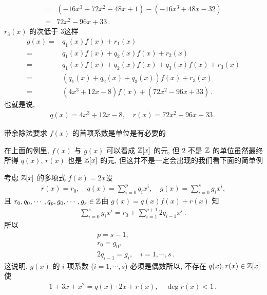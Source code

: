 \begin{example}
\begin{align*}
        = {} & (-16x^3 + 72x^2 - 48x + 1) - (-16x^3 + 48x - 32)  \\
        = {} & 72x^2 - 96x + 33 \period
    \end{align*}
    $r_3 (x)$ 的次低于 $3$\period 这样
    \begin{align*}
        g(x)
        = {} & q_1 (x) f(x) + r_1 (x)                               \\
        = {} & q_1 (x) f(x) + q_2 (x) f(x) + r_2 (x)                \\
        = {} & q_1 (x) f(x) + q_2 (x) f(x) + q_3 (x) f(x) + r_3 (x) \\
        = {} & (q_1 (x) + q_2 (x) + q_3 (x)) f(x) + r_3 (x)         \\
        = {} & (4x^3 + 12x - 8) f(x) + (72x^2 - 96x + 33) \period
    \end{align*}
    也就是说,
    \begin{align*}
        q(x) = 4x^3 + 12x - 8, \quad r(x) = 72x^2 - 96x + 33 \period
    \end{align*}
\end{example}

\begin{remark}
    带余除法要求 $f(x)$ 的首项系数是单位是有必要的\period

    在上面的例里, $f(x)$ 与 $g(x)$ 可以看成 $\mathbb{Z}[x]$ 的元, 但 $2$ 不是 $\mathbb{Z}$ 的单位\period 虽然最终所得 $q(x)$, $r(x)$ 也是 $\mathbb{Z}[x]$ 的元, 但这并不是一定会出现的\period 我们看下面的简单例\period

    考虑 $\mathbb{Z}[x]$ 的多项式 $f(x)=2x$\period 设
    \begin{align*}
        r(x) = r_0, \quad q(x) = \sum_{i=0}^{p} q_i x^i, \quad g(x) = \sum_{i=0}^{s} g_i x^i,
    \end{align*}
    且 $r_0, q_0, \cdots, q_p, g_0, \cdots, g_s \in \mathbb{Z}$\period 由 $g(x) = q(x)f(x) + r(x)$ 知
    \begin{align*}
        \sum_{i=0}^{s} g_i x^i = r_0 + \sum_{i=1}^{p+1} 2q_{i-1} x^i \period
    \end{align*}
    所以
    \begin{align*}
         & p = s - 1,                                 \\
         & r_0 = g_0,                                 \\
         & 2q_{i-1} = g_i, \quad i=1,\cdots,s \period
    \end{align*}
    这说明, $g(x)$ 的 $i$ 项系数 ($i=1,\cdots,s$) 必须是偶数\period 所以, 不存在 $q(x),r(x) \in \mathbb{Z}[x]$ 使
    \begin{align*}
        1 + 3x + x^2 = q(x) \cdot 2x + r(x), \quad \deg r(x) < 1 \period
    \end{align*}
\end{remark}

